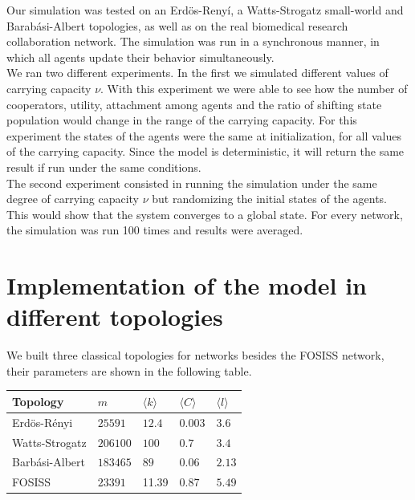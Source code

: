 \documentclass[11pt]{article}
\begin{document}
Our simulation was tested on an Erd\"{o}s-Reny\'i, a
Watts-Strogatz small-world and Barab\'asi-Albert topologies, as well
as on the real biomedical research collaboration network. The
simulation was run in a synchronous manner, in which all agents update their
behavior simultaneously. \\   

We ran two different experiments. In the first we simulated different values of
carrying capacity $\nu$. With this experiment we were able to see how the number of
cooperators, utility, attachment among agents and the ratio of
shifting state population would change in the range of the carrying
capacity. For this experiment the states of the agents were the same at
initialization, for all values of the carrying capacity. Since the model is
deterministic, it will return the same result if run under the same
conditions.\\ 

The second experiment consisted in running the simulation under the same degree of carrying capacity $\nu$ but randomizing the initial states of the agents. This would show that the system converges to a global state. For every network, the simulation was run 100 times and results were averaged.

\section{Implementation of the model in different topologies}

We built three classical topologies for networks besides the FOSISS network, their parameters are shown in the following table.\\


\begin{tabular}{| l |  l | l |l|l|}
\hline
\bf{Topology}       & $m$              & $\langle k \rangle$          & $\langle C \rangle$      & $\langle l \rangle$ \\ \hline
Erd\"{o}s-R\'enyi  &  $25591$      &  $12.4$        &  $0.003$ & $3.6$  \\ \hline
Watts-Strogatz    &  $206100$   &  $100$         &  $0.7$      & $3.4$  \\ \hline
Barb\'asi-Albert    &  $183465$   &  $89$           &  $0.06$    & $2.13$ \\ \hline
FOSISS                    &  $23391$     &   11.39     &  $0.87$    &  $5.49$ \\ \hline
\end{tabular}\\ 
\end{document}
